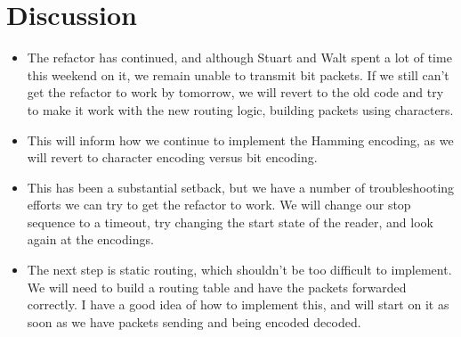 \documentclass{article}
\begin{document}
\section*{Discussion}
\begin{itemize}
    \item The refactor has continued, and although Stuart and Walt spent a lot of time this weekend on it, we remain unable to transmit bit packets.
    If we still can't get the refactor to work by tomorrow, we will revert to the old code and try to make it work with the new routing logic, building 
    packets using characters. 
    \item This will inform how we continue to implement the Hamming encoding, as we will revert to character encoding versus bit encoding. 
    \item This has been a substantial setback, but we have a number of troubleshooting efforts we can try to get the refactor to work. We will 
    change our stop sequence to a timeout, try changing the start state of the reader, and look again at the encodings. 
    \item The next step is static routing, which shouldn't be too difficult to implement. We will need to build a routing table and have the packets forwarded 
    correctly. I have a good idea of how to implement this, and will start on it as soon as we have packets sending and being encoded decoded. 
\end{itemize}

\end{document}
